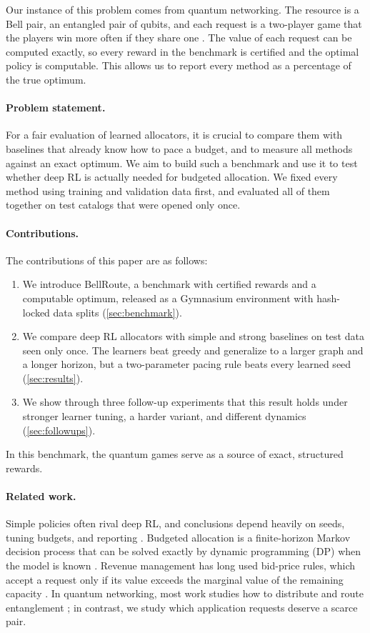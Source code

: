 \documentclass[10pt]{article}
\begin{document}
Our instance of this problem comes from quantum networking. The resource is a Bell pair, an entangled pair of qubits, and each request is a two-player game that the players win more often if they share one \citep{clauser1969proposed,cleve2004consequences}. The value of each request can be computed exactly, so every reward in the benchmark is certified and the optimal policy is computable. This allows us to report every method as a percentage of the true optimum.

\paragraph{Problem statement.} For a fair evaluation of learned allocators, it is crucial to compare them with baselines that already know how to pace a budget, and to measure all methods against an exact optimum. We aim to build such a benchmark and use it to test whether deep RL is actually needed for budgeted allocation. We fixed every method using training and validation data first, and evaluated all of them together on test catalogs that were opened only once.

\paragraph{Contributions.} The contributions of this paper are as follows:
\begin{enumerate}[leftmargin=*]
  \item We introduce BellRoute, a benchmark with certified rewards and a computable optimum, released as a Gymnasium environment with hash-locked data splits (\cref{sec:benchmark}).
  \item We compare deep RL allocators with simple and strong baselines on test data seen only once. The learners beat greedy and generalize to a larger graph and a longer horizon, but a two-parameter pacing rule beats every learned seed (\cref{sec:results}).
  \item We show through three follow-up experiments that this result holds under stronger learner tuning, a harder variant, and different dynamics (\cref{sec:followups}).
\end{enumerate}
In this benchmark, the quantum games serve as a source of exact, structured rewards.

\paragraph{Related work.} Simple policies often rival deep RL, and conclusions depend heavily on seeds, tuning budgets, and reporting \citep{rajeswaran2017towards,mania2018simple,agarwal2021deep}. Budgeted allocation is a finite-horizon Markov decision process that can be solved exactly by dynamic programming (DP) when the model is known \citep{puterman1994markov,bertsekas2017dynamic}. Revenue management has long used bid-price rules, which accept a request only if its value exceeds the marginal value of the remaining capacity \citep{gallego1994optimal,talluri2004theory,adelman2007dynamic}. In quantum networking, most work studies how to distribute and route entanglement \citep{wehner2018quantum,pant2019routing}; in contrast, we study which application requests deserve a scarce pair.
\end{document}
